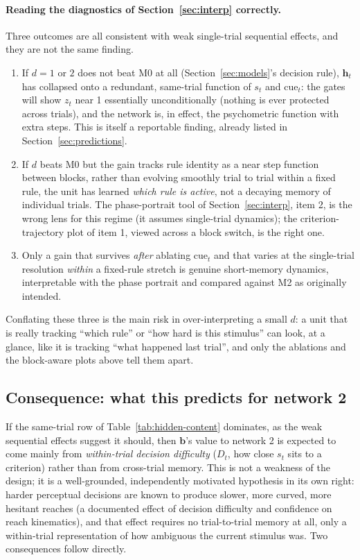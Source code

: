 \documentclass[11pt,a4paper]{article}
\newcommand{\vect}[1]{\bm{#1}}
\newcommand{\cue}{\mathrm{cue}}
\begin{document}
\paragraph{Reading the diagnostics of Section~\ref{sec:interp} correctly.} Three
outcomes are all consistent with weak single-trial sequential effects, and they are not
the same finding.
\begin{enumerate}[leftmargin=*]
\item If $d = 1$ or $2$ does not beat M0 at all (Section~\ref{sec:models}'s decision
      rule), $\vect{h}_t$ has collapsed onto a redundant, same-trial function of $s_t$
      and $\cue_t$: the gates will show $z_t$ near 1 essentially unconditionally (nothing
      is ever protected across trials), and the network is, in effect, the psychometric
      function with extra steps. This is itself a reportable finding, already listed in
      Section~\ref{sec:predictions}.
\item If $d$ beats M0 but the gain tracks rule identity as a near step function between
      blocks, rather than evolving smoothly trial to trial within a fixed rule, the unit
      has learned \emph{which rule is active}, not a decaying memory of individual
      trials. The phase-portrait tool of Section~\ref{sec:interp}, item 2, is the wrong
      lens for this regime (it assumes single-trial dynamics); the criterion-trajectory
      plot of item 1, viewed across a block switch, is the right one.
\item Only a gain that survives \emph{after} ablating $\cue_t$ and that varies at the
      single-trial resolution \emph{within} a fixed-rule stretch is genuine short-memory
      dynamics, interpretable with the phase portrait and compared against M2 as
      originally intended.
\end{enumerate}
Conflating these three is the main risk in over-interpreting a small $d$: a unit that
is really tracking ``which rule'' or ``how hard is this stimulus'' can look, at a glance,
like it is tracking ``what happened last trial'', and only the ablations and the
block-aware plots above tell them apart.

\subsection{Consequence: what this predicts for network 2}

If the same-trial row of Table~\ref{tab:hidden-content} dominates, as the weak
sequential effects suggest it should, then $\vect{b}$'s value to network 2 is expected
to come mainly from \emph{within-trial decision difficulty} ($D_t$, how close $s_t$ sits
to a criterion) rather than from cross-trial memory. This is not a weakness of the
design; it is a well-grounded, independently motivated hypothesis in its own right: harder
perceptual decisions are known to produce slower, more curved, more hesitant reaches
(a documented effect of decision difficulty and confidence on reach kinematics), and that
effect requires no trial-to-trial memory at all, only a within-trial representation of
how ambiguous the current stimulus was. Two consequences follow directly.
\end{document}
